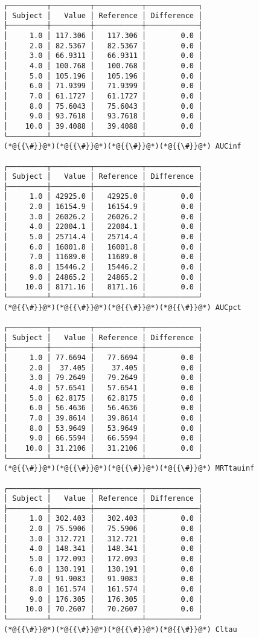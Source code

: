 \documentclass[12pt,a4paper]{article}
\begin{document}
\begin{lstlisting}
┌─────────┬─────────┬───────────┬────────────┐
│ Subject │   Value │ Reference │ Difference │
├─────────┼─────────┼───────────┼────────────┤
│     1.0 │ 117.306 │   117.306 │        0.0 │
│     2.0 │ 82.5367 │   82.5367 │        0.0 │
│     3.0 │ 66.9311 │   66.9311 │        0.0 │
│     4.0 │ 100.768 │   100.768 │        0.0 │
│     5.0 │ 105.196 │   105.196 │        0.0 │
│     6.0 │ 71.9399 │   71.9399 │        0.0 │
│     7.0 │ 61.1727 │   61.1727 │        0.0 │
│     8.0 │ 75.6043 │   75.6043 │        0.0 │
│     9.0 │ 93.7618 │   93.7618 │        0.0 │
│    10.0 │ 39.4088 │   39.4088 │        0.0 │
└─────────┴─────────┴───────────┴────────────┘
(*@{{\#}}@*)(*@{{\#}}@*)(*@{{\#}}@*)(*@{{\#}}@*) AUCinf

┌─────────┬─────────┬───────────┬────────────┐
│ Subject │   Value │ Reference │ Difference │
├─────────┼─────────┼───────────┼────────────┤
│     1.0 │ 42925.0 │   42925.0 │        0.0 │
│     2.0 │ 16154.9 │   16154.9 │        0.0 │
│     3.0 │ 26026.2 │   26026.2 │        0.0 │
│     4.0 │ 22004.1 │   22004.1 │        0.0 │
│     5.0 │ 25714.4 │   25714.4 │        0.0 │
│     6.0 │ 16001.8 │   16001.8 │        0.0 │
│     7.0 │ 11689.0 │   11689.0 │        0.0 │
│     8.0 │ 15446.2 │   15446.2 │        0.0 │
│     9.0 │ 24865.2 │   24865.2 │        0.0 │
│    10.0 │ 8171.16 │   8171.16 │        0.0 │
└─────────┴─────────┴───────────┴────────────┘
(*@{{\#}}@*)(*@{{\#}}@*)(*@{{\#}}@*)(*@{{\#}}@*) AUCpct

┌─────────┬─────────┬───────────┬────────────┐
│ Subject │   Value │ Reference │ Difference │
├─────────┼─────────┼───────────┼────────────┤
│     1.0 │ 77.6694 │   77.6694 │        0.0 │
│     2.0 │  37.405 │    37.405 │        0.0 │
│     3.0 │ 79.2649 │   79.2649 │        0.0 │
│     4.0 │ 57.6541 │   57.6541 │        0.0 │
│     5.0 │ 62.8175 │   62.8175 │        0.0 │
│     6.0 │ 56.4636 │   56.4636 │        0.0 │
│     7.0 │ 39.8614 │   39.8614 │        0.0 │
│     8.0 │ 53.9649 │   53.9649 │        0.0 │
│     9.0 │ 66.5594 │   66.5594 │        0.0 │
│    10.0 │ 31.2106 │   31.2106 │        0.0 │
└─────────┴─────────┴───────────┴────────────┘
(*@{{\#}}@*)(*@{{\#}}@*)(*@{{\#}}@*)(*@{{\#}}@*) MRTtauinf

┌─────────┬─────────┬───────────┬────────────┐
│ Subject │   Value │ Reference │ Difference │
├─────────┼─────────┼───────────┼────────────┤
│     1.0 │ 302.403 │   302.403 │        0.0 │
│     2.0 │ 75.5906 │   75.5906 │        0.0 │
│     3.0 │ 312.721 │   312.721 │        0.0 │
│     4.0 │ 148.341 │   148.341 │        0.0 │
│     5.0 │ 172.093 │   172.093 │        0.0 │
│     6.0 │ 130.191 │   130.191 │        0.0 │
│     7.0 │ 91.9083 │   91.9083 │        0.0 │
│     8.0 │ 161.574 │   161.574 │        0.0 │
│     9.0 │ 176.305 │   176.305 │        0.0 │
│    10.0 │ 70.2607 │   70.2607 │        0.0 │
└─────────┴─────────┴───────────┴────────────┘
(*@{{\#}}@*)(*@{{\#}}@*)(*@{{\#}}@*)(*@{{\#}}@*) Cltau


\end{lstlisting}
\end{document}
